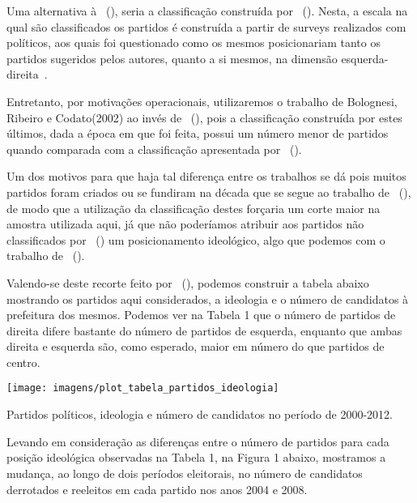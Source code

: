 \documentclass[
	12pt,				%
	openright,			%
	twoside,			%
	a4paper,			%
	openany,
	english,			%
	brazil				%
	]{abntex2}
\begin{document}
Uma alternativa à ~(\citeyear{Bolognesi2022Sep}), seria a classificação construída por ~(\citeyear{Power2009}). Nesta, a escala na qual são classificados os partidos é construída a partir de surveys realizados com políticos, aos quais foi questionado como os mesmos posicionariam tanto os partidos sugeridos pelos autores, quanto a si mesmos, na dimensão esquerda-direita~\cite{Power2009}.

Entretanto, por motivações operacionais, utilizaremos o trabalho de Bolognesi, Ribeiro e Codato(2002) ao invés de ~(\citeyear{Power2009}), pois a classificação construída por estes últimos, dada a época em que foi feita, possui um número menor de partidos quando comparada com a classificação apresentada por ~(\citeyear{Bolognesi2022Sep}). 

Um dos motivos para que haja tal diferença entre os trabalhos se dá pois muitos partidos foram criados ou se fundiram na década que se segue ao trabalho de ~(\citeyear{Power2009}), de modo que a utilização da classificação destes forçaria um corte maior na amostra utilizada aqui, já que não poderíamos atribuir aos partidos não classificados por ~(\citeyear{Power2009}) um posicionamento ideológico, algo que podemos com o trabalho de ~(\citeyear{Bolognesi2022Sep}).

Valendo-se deste recorte feito por ~(\citeyear{Bolognesi2022Sep}), podemos construir a tabela abaixo mostrando os partidos aqui considerados, a ideologia e o número de candidatos à prefeitura dos mesmos. Podemos ver na Tabela 1 que o número de partidos de direita difere bastante do número de partidos de esquerda, enquanto que ambas direita e esquerda são, como esperado, maior em número do que partidos de centro.

\begin{table}[htp!]
	\centering
	\hfill\texttt{[image: imagens/plot\_tabela\_partidos\_ideologia]}\hspace{\fill}
	\caption{Partidos políticos, ideologia e número de candidatos no período de 2000-2012.}
	\label{fig:plottabelapartidosideologia}
\end{table}

Levando em consideração as diferenças entre o número de partidos para cada posição ideológica observadas na Tabela 1, na Figura 1 abaixo, mostramos a mudança, ao longo de dois períodos eleitorais, no número de candidatos derrotados e reeleitos em cada partido nos anos 2004 e 2008.
\end{document}
